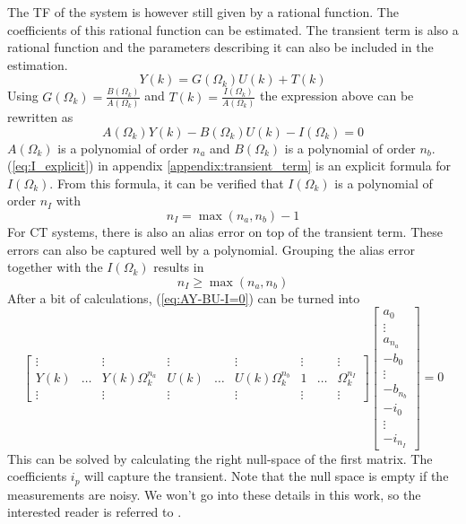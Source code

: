 The TF of the system is however still given by a rational function. The coefficients of this rational function can be estimated. The transient term is also a rational function and the parameters describing it can also be included in the estimation.
\begin{equation*}
    Y(k) = G(\Omega_k) U(k) + T(k)
\end{equation*}
Using $G(\Omega_k) = \frac{B(\Omega_k)}{A(\Omega_k)}$ and $T(k) = \frac{I(\Omega_k)}{A(\Omega_k)}$ the expression above can be rewritten as
\begin{equation}
    A(\Omega_k) Y(k) - B(\Omega_k) U(k) - I(\Omega_k) = 0
    \label{eq:AY-BU-I=0}
\end{equation}
$A(\Omega_k)$ is a polynomial of order $n_a$ and $B(\Omega_k)$ is a polynomial of order $n_b$. (\ref{eq:I_explicit}) in appendix \ref{appendix:transient_term} is an explicit formula for $I(\Omega_k)$. From this formula, it can be verified that $I(\Omega_k)$ is a polynomial of order $n_I$ with
\begin{equation*}
    n_I = \max{(n_a,n_b)}-1
\end{equation*}
For CT systems, there is also an alias error on top of the transient term. These errors can also be captured well by a polynomial. Grouping the alias error together with the $I(\Omega_k)$ results in \cite[Section 6.3.2.3]{pintelon_book}
\begin{equation*}
    n_I \geq \max{(n_a,n_b)}
\end{equation*}
After a bit of calculations, (\ref{eq:AY-BU-I=0}) can be turned into
\begin{equation*}
    \begin{bmatrix}
    \vdots & & \vdots & \vdots & & \vdots & \vdots & & \vdots \\
    Y(k) & \hdots & Y(k) \Omega_k^{n_a} & 
    U(k) & \hdots & U(k) \Omega_k^{n_b} & 
    1    & \hdots &      \Omega_k^{n_I} \\
    \vdots & & \vdots & \vdots & & \vdots & \vdots &  & \vdots
    \end{bmatrix}
    \begin{bmatrix}
    a_0 \\ \vdots \\ a_{n_a} \\ 
    -b_0 \\ \vdots \\ -b_{n_b} \\
    -i_0 \\ \vdots \\ -i_{n_I}
    \end{bmatrix} = 0
\end{equation*}
This can be solved by calculating the right null-space of the first matrix. The coefficients $i_p$ will capture the transient. Note that the null space is empty if the measurements are noisy. We won't go into these details in this work, so the interested reader is referred to \cite{markovsky_book}.

